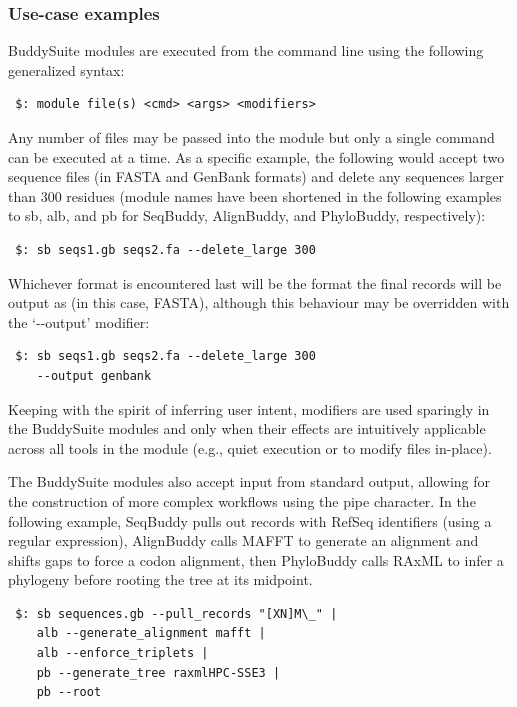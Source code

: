 \documentclass[nogrid]{MBE_article}%
\begin{document}
\subsubsection{Use-case examples}
BuddySuite modules are executed from the command line using the following generalized syntax:

\smallskip

{\small
\begin{verbatim}
 $: module file(s) <cmd> <args> <modifiers>
\end{verbatim}
}
\smallskip

Any number of files may be passed into the module but only a single command can be executed at a time. As a specific example, the following would accept two sequence files (in FASTA and GenBank formats) and delete any sequences larger than 300 residues (module names have been shortened in the following examples to sb, alb, and pb for SeqBuddy, AlignBuddy, and PhyloBuddy, respectively):

\smallskip

{\small
\begin{verbatim}
 $: sb seqs1.gb seqs2.fa --delete_large 300
\end{verbatim}
}
\smallskip

Whichever format is encountered last will be the format the final records will be output as (in this case, FASTA), although this behaviour may be overridden with the `-{}-output' modifier:

\smallskip

{\small
\begin{verbatim}
 $: sb seqs1.gb seqs2.fa --delete_large 300
    --output genbank
\end{verbatim}
}
\smallskip

Keeping with the spirit of inferring user intent, modifiers are used sparingly in the BuddySuite modules and only when their effects are intuitively applicable across all tools in the module (e.g., quiet execution or to modify files in-place).

The BuddySuite modules also accept input from standard output, allowing for the construction of more complex workflows using the pipe character. In the following example, SeqBuddy pulls out records with RefSeq identifiers (using a regular expression), AlignBuddy calls MAFFT to generate an alignment and shifts gaps to force a codon alignment, then PhyloBuddy calls RAxML to infer a phylogeny before rooting the tree at its midpoint.

\smallskip
{\small
\begin{verbatim}
 $: sb sequences.gb --pull_records "[XN]M\_" |
    alb --generate_alignment mafft |
    alb --enforce_triplets |
    pb --generate_tree raxmlHPC-SSE3 |
    pb --root
\end{verbatim}
}
\end{document}
